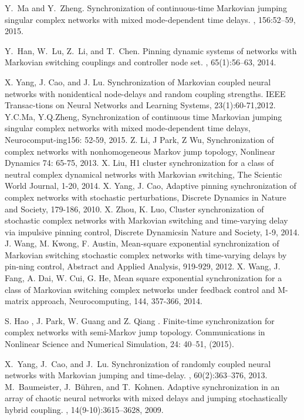 \begin{thebibliography}{99}
Y.~Ma and Y.~Zheng.
\newblock Synchronization of continuous-time {M}arkovian jumping singular
  complex networks with mixed mode-dependent time delays.
, 156:52--59, 2015.

Y.~Han, W.~Lu, Z.~Li, and T.~Chen.
\newblock Pinning dynamic systems of networks with {M}arkovian switching
  couplings and controller node set.
, 65(1):56--63, 2014.

 X. Yang, J. Cao, and J. Lu. Synchronization of Markovian coupled neural networks with nonidentical node-delays and random coupling strengths. IEEE Transac-tions on Neural Networks and Learning Systems, 23(1):60-71,2012.
 Y.C.Ma, Y.Q.Zheng, Synchronization of continuous time Markovian jumping singular complex networks with mixed mode-dependent time delays, Neurocomput-ing156: 52-59, 2015.
 Z. Li, J Park, Z Wu, Synchronization of complex networks with nonhomogeneous Markov jump topology, Nonlinear Dynamics 74: 65-75, 2013.
 X. Liu, H1 cluster synchronization for a class of neutral complex dynamical networks with Markovian switching, The Scientic World Journal, 1-20, 2014.
 X. Yang, J. Cao, Adaptive pinning synchronization of complex networks with stochastic perturbations, Discrete Dynamics in Nature and Society, 179-186, 2010.
 X. Zhou, K. Luo, Cluster synchronization of stochastic complex networks with Markovian switching and time-varying delay via impulsive pinning control, Discrete Dynamicsin Nature and Society, 1-9, 2014.
 J. Wang, M. Kwong, F. Austin, Mean-square exponential synchronization of Markovian switching stochastic complex networks with time-varying delays by pin-ning control, Abstract and Applied Analysis, 919-929, 2012.
 X. Wang, J. Fang, A. Dai, W. Cui, G. He, Mean square exponential synchronization for a class of Markovian switching complex networks under feedback control and M-matrix approach, Neurocomputing, 144, 357-366, 2014.


 S. Hao , J. Park, W. Guang and Z. Qiang . Finite-time synchronization for complex networks with semi-Markov jump topology. Communications in Nonlinear Science and Numerical Simulation, 24: 40–51, (2015).

X.~Yang, J.~Cao, and J.~Lu.
\newblock Synchronization of randomly coupled neural networks with {M}arkovian
  jumping and time-delay.
,
  60(2):363--376, 2013.
M.~Baumeister, J.~Bühren, and T.~Kohnen.
\newblock Adaptive synchronization in an array of chaotic neural networks with
  mixed delays and jumping stochastically hybrid coupling.
,
  14(9-10):3615--3628, 2009.


\end{thebibliography}
